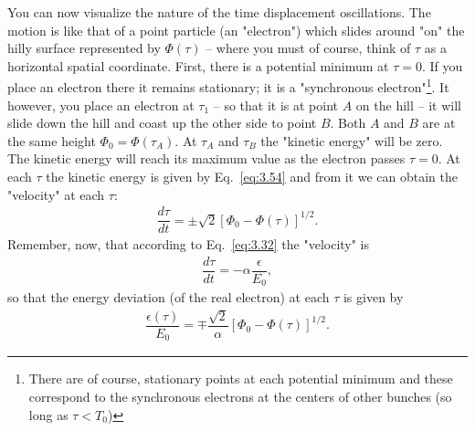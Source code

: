 You can now visualize the nature of the time displacement oscillations. The motion is like that of a point particle (an "electron") which slides around "on" the hilly surface represented by $\Phi(\tau)$ -- where you must of course, think of $\tau$ as a horizontal spatial coordinate. First, there is a potential minimum at $\tau = 0$. If you place an electron there it remains stationary; it is a "synchronous electron"\footnote{There are of course, stationary points at each potential minimum and these correspond to the synchronous electrons at the centers of other bunches (so long as $\tau < T_0$)}. It however, you place an electron at $\tau_1$ -- so that it is at point $A$ on the hill -- it will slide down the hill and coast up the other side to point $B$. Both $A$ and $B$ are at the same height $\Phi_0 = \Phi(\tau_A)$. At $\tau_A$ and $\tau_B$
 the "kinetic energy" will be zero. The kinetic energy will reach its maximum value as the electron passes $\tau = 0$. At each $\tau$ the kinetic energy is given by Eq.~\eqref{eq:3.54} and from it we can obtain the "velocity" at each $\tau$:
\begin{align}
	\dfrac{d\tau}{dt} = \pm \sqrt{2} \left[ \Phi_0 - \Phi(\tau) \right]^{1/2}.
\end{align}
Remember, now, that according to Eq.~\eqref{eq:3.32} the "velocity" is
\begin{align*}
	\dfrac{d\tau}{dt} = - \alpha \dfrac{\epsilon}{E_0},
\end{align*}
so that the energy deviation (of the real electron) at each $\tau$ is given by
\begin{align}\label{eq:3.56}
	\dfrac{\epsilon(\tau)}{E_0} = \mp \dfrac{\sqrt{2}}{\alpha} \left[ \Phi_0 - \Phi(\tau) \right]^{1/2}.
\end{align}

